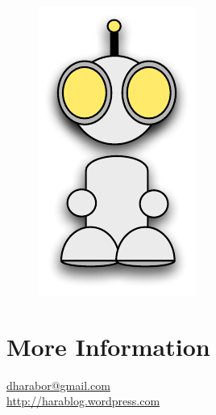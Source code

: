 \begin{figure}
\vspace{-5em}
		\includegraphics[width=0.17\columnwidth]{diagrams/robot_front.pdf}
\vspace{-7em}
 \end{figure}

\section{More Information}
{\Huge \url{dharabor@gmail.com } } \newline \\ 
{ \Huge \url{http://harablog.wordpress.com }}
